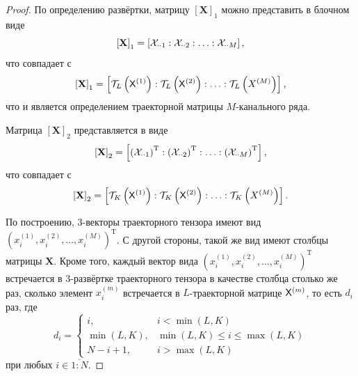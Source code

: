 \documentclass[specialist,
  substylefile = spbu.rtx,
subf,href,colorlinks=true, 12pt]{disser}
\theoremstyle{plain}
\theoremstyle{definition}
\theoremstyle{remark}
\begin{document}
\begin{proof}
  По определению развёртки, матрицу $\left[\mathbf{X}\right]_1$ можно
  представить в блочном виде
  \begin{equation*}
    \left[\mathbf{X}\right]_1 = \left[\mathcal{X}_{\cdot \cdot 1} :
    \mathcal{X}_{\cdot \cdot 2} : \ldots : \mathcal{X}_{\cdot \cdot M}\right],
  \end{equation*}
  что совпадает с
  \begin{equation*}
    \left[\mathbf{X}\right]_1 = \left[\mathcal{T}_L \left(\mathsf{X}^{(1)}\right) :
      \mathcal{T}_L \left(\mathsf{X}^{(2)}\right) : \ldots :  \mathcal{T}_L
    \left(X^{(M)}\right)\right],
  \end{equation*}
  что и является определением траекторной матрицы $M$-канального ряда.

  Матрица $\left[\mathbf{X}\right]_2$ представляется в виде
  \begin{equation*}
    \left[\mathbf{X}\right]_2 = \left[\left(\mathcal{X}_{\cdot \cdot
      1}\right)^{\mathrm{T}} :
      \left(\mathcal{X}_{\cdot \cdot 2}\right)^{\mathrm{T}} : \ldots :
    \left(\mathcal{X}_{\cdot \cdot M}\right)^{\mathrm{T}}\right],
  \end{equation*}
  что совпадает с
  \begin{equation*}
    \left[\mathbf{X}\right]_2 = \left[\mathcal{T}_K \left(\mathsf{X}^{(1)}\right) :
      \mathcal{T}_K \left(\mathsf{X}^{(2)}\right) : \ldots :  \mathcal{T}_K
    \left(X^{(M)}\right)\right].
  \end{equation*}

  По построению, 3-векторы траекторного тензора имеют вид
  $\left(x_i^{(1)}, x_i^{(2)}, \dots, x_i^{(M)}\right)^{\mathrm{T}}$.
  С другой стороны, такой же вид имеют столбцы матрицы $\mathbf{X}$.
  Кроме того, каждый вектор вида $\left(x_i^{(1)}, x_i^{(2)}, \dots,
  x_i^{(M)}\right)^{\mathrm{T}}$ встречается в 3-развёртке
  траекторного тензора в качестве столбца столько же
  раз, сколько элемент $x_i^{(m)}$ встречается в $L$-траекторной
  матрице $\mathsf{X}^{(m)}$, то есть $d_i$ раз, где
  \begin{equation}\label{eq:tmssa_xts_weights}
    d_i =
    \begin{cases}
      i, & i < \min(L, K)\\
      \min(L, K), & \min(L, K) \leqslant i \leqslant \max(L, K)\\
      N - i + 1, & i > \max(L, K)
    \end{cases}
  \end{equation}
  при любых $i\in \overline{1:N}$.
\end{proof}
\end{document}
